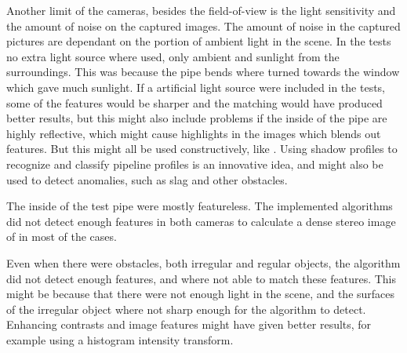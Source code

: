 Another limit of the cameras, besides the field-of-view is the light sensitivity and
the amount of noise on the captured images. The amount of noise in the captured pictures
are dependant on the portion of ambient light in the scene. In the tests no extra
light source where used, only ambient and sunlight from the surroundings. This was because
the pipe bends where turned towards the window which gave much sunlight. If a artificial
light source were included in the tests, some of the features would be sharper and the
matching would have produced better results, but this might also include problems if the
inside of the pipe are highly reflective, which might cause highlights in the images which
blends out features. But this might all be used constructively, like \cite{MRINSPECT-V}.
Using shadow profiles to recognize and classify pipeline profiles is an innovative idea,
and might also be used to detect anomalies, such as slag and other obstacles. 

The inside of the test pipe were mostly featureless. The implemented algorithms did not
detect enough features in both cameras to calculate a dense stereo image of in most of the
cases. 

Even when there were obstacles, both irregular and regular objects, the algorithm did not
detect enough features, and where not able to match these features. This might be because
that there were not enough light in the scene, and the surfaces of the irregular object
where not sharp enough for the algorithm to detect. Enhancing contrasts and image features
might have given better results, for example using a histogram intensity transform. \cite{gonzalez} 


